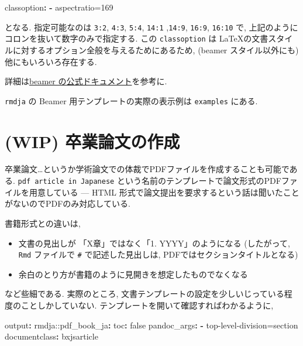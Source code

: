 \documentclass[
  xelatex,ja=standard,jafont=noto]{bxjsbook}
\newenvironment{Shaded}{\begin{snugshade}}{\end{snugshade}}
\newcommand{\AttributeTok}[1]{\textcolor[rgb]{0.77,0.63,0.00}{#1}}
\newcommand{\CharTok}[1]{\textcolor[rgb]{0.31,0.60,0.02}{#1}}
\newcommand{\FunctionTok}[1]{\textcolor[rgb]{0.00,0.00,0.00}{#1}}
\newcommand{\KeywordTok}[1]{\textcolor[rgb]{0.13,0.29,0.53}{\textbf{#1}}}
\newcommand{\StringTok}[1]{\textcolor[rgb]{0.31,0.60,0.02}{#1}}
\providecommand{\tightlist}{%
  \setlength{\itemsep}{0pt}\setlength{\parskip}{0pt}}
\theoremstyle{definition}
\theoremstyle{definition}
\theoremstyle{definition}
\theoremstyle{definition}
\theoremstyle{remark}
\begin{document}
\begin{Shaded}
\begin{Highlighting}[]
\FunctionTok{classoption}\KeywordTok{:}
\AttributeTok{  }\KeywordTok{{-}}\AttributeTok{ aspectratio=169}
\end{Highlighting}
\end{Shaded}

となる. 指定可能なのは \texttt{3:2}, \texttt{4:3}, \texttt{5:4},
\texttt{14:1} ,\texttt{14:9}, \texttt{16:9}, \texttt{16:10} で,
上記のようにコロンを抜いて数字のみで指定する. この \texttt{classoption}
は \LaTeX の文書スタイルに対するオプション全般を与えるためにあるため,
(beamer スタイル以外にも) 他にもいろいろ存在する.

詳細は\href{http://tug.ctan.org/macros/latex/contrib/beamer/doc/beameruserguide.pdf}{beamer
の公式ドキュメント}を参考に.

\texttt{rmdja} の Beamer 用テンプレートの実際の表示例は
\texttt{examples} にある.

\hypertarget{wip-ux5352ux696dux8ad6ux6587ux306eux4f5cux6210}{%
\section{(WIP)
卒業論文の作成}\label{wip-ux5352ux696dux8ad6ux6587ux306eux4f5cux6210}}

卒業論文\ldots というか学術論文での体裁でPDFファイルを作成することも可能である.
\texttt{pdf\ article\ in\ Japanese}
という名前のテンプレートで論文形式のPDFファイルを用意している --- HTML
形式で論文提出を要求するという話は聞いたことがないのでPDFのみ対応している.

書籍形式との違いは,

\begin{itemize}
\tightlist
\item
  文書の見出しが 「X章」ではなく「1. YYYY」のようになる (したがって,
  \texttt{Rmd} ファイルで \texttt{\#} で記述した見出しは,
  PDFではセクションタイトルとなる)
\item
  余白のとり方が書籍のように見開きを想定したものでなくなる
\end{itemize}

など些細である. 実際のところ,
文書テンプレートの設定を少しいじっている程度のことしかしていない.
テンプレートを開いて確認すればわかるように,

\begin{Shaded}
\begin{Highlighting}[]
\FunctionTok{output}\KeywordTok{:}
\AttributeTok{  rmdja:}\FunctionTok{:pdf\_book\_ja}\KeywordTok{:}
\AttributeTok{    }\FunctionTok{toc}\KeywordTok{:}\AttributeTok{ }\CharTok{false}
\AttributeTok{    }\FunctionTok{pandoc\_args}\KeywordTok{:}
\AttributeTok{      }\KeywordTok{{-}}\AttributeTok{ }\StringTok{\textquotesingle{}{-}{-}top{-}level{-}division=section\textquotesingle{}}
\FunctionTok{documentclass}\KeywordTok{:}\AttributeTok{ bxjsarticle}
\end{Highlighting}
\end{Shaded}
\end{document}

